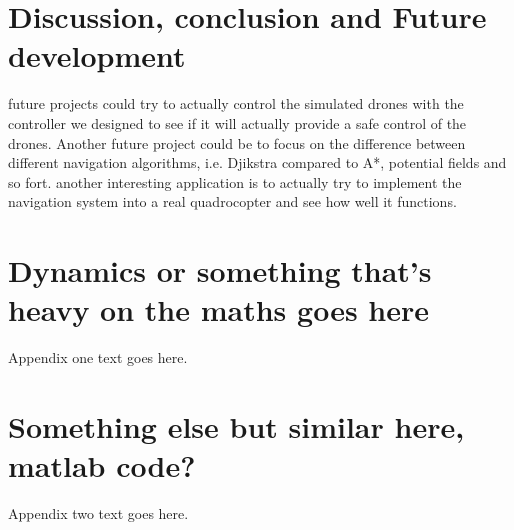 \documentclass[journal]{IEEEtran}
\begin{document}
	\section{Discussion, conclusion and Future development}
	future projects could try to actually control the simulated drones with the controller we designed to see if it will actually provide a safe control of the drones. Another future project could be to focus on the difference between different navigation algorithms, i.e. Djikstra compared to A*, potential fields and so fort. another interesting application is to actually try to implement the navigation system into a real quadrocopter and see how well it functions.	
	
	
	
	
	
	\appendices
	\section{Dynamics or something that's heavy on the maths goes here}
	Appendix one text goes here.
	
	\section{Something else but similar here, matlab code?}
	Appendix two text goes here.
	
\end{document}
